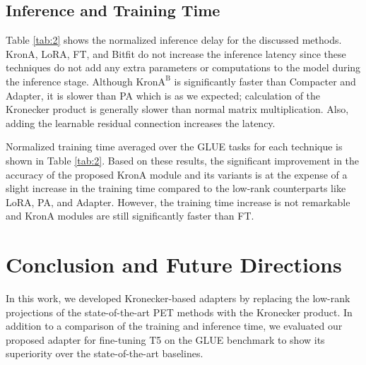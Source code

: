 \subsection{Inference and Training Time} Table \ref{tab:2} shows the normalized inference delay for the discussed methods. KronA, LoRA, FT, and Bitfit do not increase the inference latency since these techniques do not add any extra parameters or computations to the model during the inference stage. Although $\text{KronA}^\text{B}$ is significantly faster than Compacter and Adapter, it is slower than PA which is as we expected; calculation of the Kronecker product is generally slower than normal matrix multiplication. Also, adding the learnable residual connection increases the latency.

Normalized training time averaged over the GLUE tasks for each technique is shown in Table \ref{tab:2}. Based on these results, the significant improvement in the accuracy of the proposed KronA module and its variants is at the expense of a slight increase in the training time compared to the low-rank counterparts like LoRA, PA, and Adapter. However, the training time increase is not remarkable and KronA modules are still significantly faster than FT.

\section{Conclusion and Future Directions}
\label{sec:con}
In this work, we developed Kronecker-based adapters by replacing the low-rank projections of the state-of-the-art PET methods with the Kronecker product. In addition to a comparison of the training and inference time, we evaluated our proposed adapter for fine-tuning T5 on the GLUE benchmark to show its superiority over the state-of-the-art baselines.


